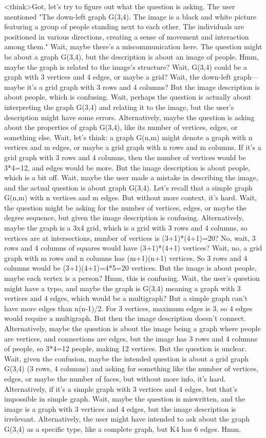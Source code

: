 <think>Got, let's try to figure out what the question is asking. The user mentioned "The down-left graph G(3,4). The image is a black and white picture featuring a group of people standing next to each other. The individuals are positioned in various directions, creating a sense of movement and interaction among them." Wait, maybe there's a miscommunication here. The question might be about a graph G(3,4), but the description is about an image of people. Hmm, maybe the graph is related to the image's structure? Wait, G(3,4) could be a graph with 3 vertices and 4 edges, or maybe a grid? Wait, the down-left graph—maybe it's a grid graph with 3 rows and 4 columns? But the image description is about people, which is confusing. Wait, perhaps the question is actually about interpreting the graph G(3,4) and relating it to the image, but the user's description might have some errors. Alternatively, maybe the question is asking about the properties of graph G(3,4), like its number of vertices, edges, or something else. Wait, let's think: a graph G(n,m) might denote a graph with n vertices and m edges, or maybe a grid graph with n rows and m columns. If it's a grid graph with 3 rows and 4 columns, then the number of vertices would be 3*4=12, and edges would be more. But the image description is about people, which is a bit off. Wait, maybe the user made a mistake in describing the image, and the actual question is about graph G(3,4). Let's recall that a simple graph G(n,m) with n vertices and m edges. But without more context, it's hard. Wait, the question might be asking for the number of vertices, edges, or maybe the degree sequence, but given the image description is confusing. Alternatively, maybe the graph is a 3x4 grid, which is a grid with 3 rows and 4 columns, so vertices are at intersections, number of vertices is (3+1)*(4+1)=20? No, wait, 3 rows and 4 columns of squares would have (3+1)*(4+1) vertices? Wait, no, a grid graph with m rows and n columns has (m+1)(n+1) vertices. So 3 rows and 4 columns would be (3+1)(4+1)=4*5=20 vertices. But the image is about people, maybe each vertex is a person? Hmm, this is confusing. Wait, the user's question might have a typo, and maybe the graph is G(3,4) meaning a graph with 3 vertices and 4 edges, which would be a multigraph? But a simple graph can't have more edges than n(n-1)/2. For 3 vertices, maximum edges is 3, so 4 edges would require a multigraph. But then the image description doesn't connect. Alternatively, maybe the question is about the image being a graph where people are vertices, and connections are edges, but the image has 3 rows and 4 columns of people, so 3*4=12 people, making 12 vertices. But the question is unclear. Wait, given the confusion, maybe the intended question is about a grid graph G(3,4) (3 rows, 4 columns) and asking for something like the number of vertices, edges, or maybe the number of faces, but without more info, it's hard. Alternatively, if it's a simple graph with 3 vertices and 4 edges, but that's impossible in simple graph. Wait, maybe the question is miswritten, and the image is a graph with 3 vertices and 4 edges, but the image description is irrelevant. Alternatively, the user might have intended to ask about the graph G(3,4) as a specific type, like a complete graph, but K4 has 6 edges. Hmm. 